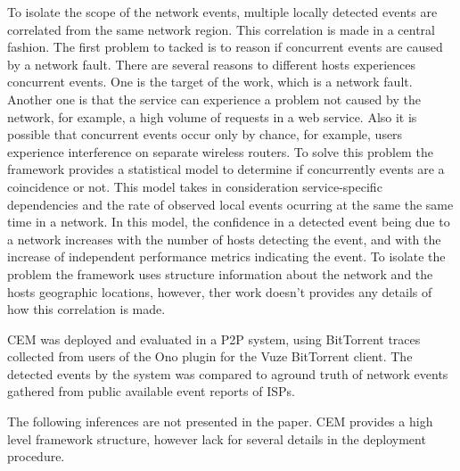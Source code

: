 To isolate
the scope of the network events, multiple locally detected events are
correlated from the same network region. This correlation is made in a central
fashion.
The first problem to tacked is to reason if concurrent events are caused by a
network fault. There are several reasons to different hosts experiences
concurrent events. One is the target of the work, which is a network fault.
Another one is that the service can experience a problem not caused by the
network, for example, a high volume of requests in a web service. Also it is
possible that concurrent events occur only by chance, for example, users
experience interference on separate wireless routers. To solve this problem the
framework provides a statistical model to determine if
concurrently events are a coincidence or not. This model takes in
consideration service-specific dependencies and the rate of observed local
events ocurring at the same the same time in a network. In this model, the
confidence in a detected event being due to a network increases with the
number of hosts detecting the event, and with the increase of independent
performance metrics indicating the event. To isolate the problem the framework
uses structure information about the network and the hosts geographic
locations, however, ther work doesn't provides any details of how this
correlation is made.

CEM was deployed and evaluated in a P2P system, using BitTorrent traces collected
from users of the Ono plugin for the Vuze BitTorrent client. The detected
events by the system was compared to aground truth
of network events gathered from public available event reports of ISPs.

The following inferences are not presented in the paper.
CEM provides a high level framework structure, however lack for several details
in the deployment procedure.
